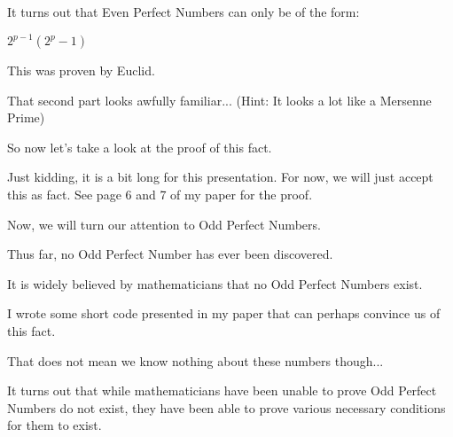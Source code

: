 \documentclass{beamer}
\begin{document}
\begin{frame}

It turns out that Even Perfect Numbers can only be of the form:

\begin{center}

$2^{p-1} (2^p - 1)$

\end{center}

This was proven by Euclid.

\medskip

That second part looks awfully familiar... (Hint: It looks a lot like a Mersenne Prime)

\medskip

So now let's take a look at the proof of this fact.

\end{frame}

\begin{frame}

Just kidding, it is a bit long for this presentation. For now, we will just accept this as fact. See page 6 and 7 of my paper for the proof.

\end{frame}

\begin{frame}

Now, we will turn our attention to Odd Perfect Numbers.

\bigskip

Thus far, no Odd Perfect Number has ever been discovered. 

It is widely believed by mathematicians that no Odd Perfect Numbers exist.

I wrote some short code presented in my paper that can perhaps convince us of this fact.

\bigskip

That does not mean we know nothing about these numbers though...

\end{frame}

\begin{frame}

It turns out that while mathematicians have been unable to prove Odd Perfect Numbers do not exist, they have been able to prove various necessary conditions for them to exist.

\end{frame}
\end{document}
